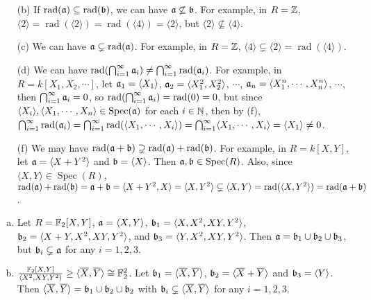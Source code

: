 \begin{example}
    \begin{enumerate}
        \item[(b)] If $\operatorname{rad}(\mathfrak{a}) \subseteq \operatorname{rad}(\mathfrak{b})$, we can have $\mathfrak{a} \not \subseteq \mathfrak{b}$. For example, in $R = \mathbb{Z}$, $\langle 2 \rangle = \operatorname{rad}(\langle 2 \rangle) = \operatorname{rad}(\langle 4 \rangle) = \langle 2 \rangle$, but $\langle 2 \rangle \not \subseteq \langle 4 \rangle$.
        \item[(c)]
            We can have $\mathfrak{a} \subsetneq \operatorname{rad}(\mathfrak{a})$. For example, in $R = \mathbb{Z}$, $\langle 4 \rangle \subsetneq \langle 2 \rangle = \operatorname{rad}(\langle 4 \rangle)$.
        \item[(d)] We can have $\operatorname{rad}(\bigcap_{i=1}^\infty \mathfrak{a}_i) \neq \bigcap_{i=1}^\infty \operatorname{rad}(\mathfrak{a}_i)$. For example, in $R = k[X_1,X_2,\cdots]$, let $\mathfrak{a}_1 = \langle X_1 \rangle$, $\mathfrak{a}_2 = \langle X_1^2,X_2^2 \rangle$, $\cdots$, $\mathfrak{a}_n = \langle X_1^n,\cdots,X_n^n \rangle$, $\cdots$, then $\bigcap_{i=1}^\infty \mathfrak{a}_i = 0$, so $\operatorname{rad}(\bigcap_{i=1}^\infty \mathfrak{a}_i) = \operatorname{rad}(0) = 0$, but since $\langle X_i \rangle, \langle X_1,\cdots,X_n \rangle \in \operatorname{Spec}(\mathfrak{a})$ for each $i \in \mathbb{N}$, then by (f), $\bigcap_{i=1}^\infty \operatorname{rad}(\mathfrak{a}_i) = \bigcap_{i=1}^\infty \operatorname{rad}(\langle X_1,\cdots,X_i \rangle) = \bigcap_{i=1}^\infty \langle X_1,\cdots,X_i \rangle = \langle X_1 \rangle \neq 0$. 
        \item[(f)] We may have $\operatorname{rad}(\mathfrak{a} + \mathfrak{b}) \supsetneq \operatorname{rad}(\mathfrak{a}) + \operatorname{rad}(\mathfrak{b})$. For example, in $R = k[X,Y]$, let $\mathfrak{a} = \langle X+Y^2 \rangle$ and $\mathfrak{b} = \langle X \rangle$. Then $\mathfrak{a},\mathfrak{b} \in \operatorname{Spec}(R)$. Also, since $\langle X,Y \rangle \in \operatorname{Spec}(R)$, $\operatorname{rad}(\mathfrak{a}) + \operatorname{rad}(\mathfrak{b}) = \mathfrak{a} + \mathfrak{b} = \langle X+Y^2,X \rangle = \langle X,Y^2 \rangle \subsetneq \langle X,Y \rangle = \operatorname{rad}(\langle X,Y^2 \rangle) = \operatorname{rad}(\mathfrak{a} + \mathfrak{b})$.
    \end{enumerate}
\end{example}

\begin{example}
    \begin{enumerate}[(a)]
        \item Let $R = \mathbb{F}_2[X,Y]$, $\mathfrak{a} = \langle X,Y \rangle$, $\mathfrak{b}_1 = \langle X,X^2,XY,Y^2 \rangle$, $\mathfrak{b}_2 = \langle X+Y,X^2,XY,Y^2 \rangle$, and $\mathfrak{b}_3 = \langle Y,X^2,XY,Y^2 \rangle$. Then $\mathfrak{a} = \mathfrak{b}_1 \cup \mathfrak{b}_2 \cup \mathfrak{b}_3$, but $\mathfrak{b}_i \subsetneq \mathfrak{a}$ for any $i = 1,2,3$.
        \item $\frac{\mathbb{F}_2[X,Y]}{\langle X^2,XY,Y^2 \rangle} \geq \langle \overline X, \overline Y \rangle \cong \mathbb{F}_2^2$. Let $\mathfrak{b}_1 = \langle \overline X, \overline Y \rangle$, $\mathfrak{b}_2 = \langle \overline X + \overline Y \rangle$ and $\mathfrak{b}_3 = \langle Y \rangle$. Then $\langle \overline X,\overline Y \rangle = \mathfrak{b}_1 \cup \mathfrak{b}_2 \cup \mathfrak{b}_2$ with $\mathfrak{b}_i \subsetneq \langle \overline X,\overline Y \rangle$ for any $i = 1,2,3$.
    \end{enumerate}
\end{example}

